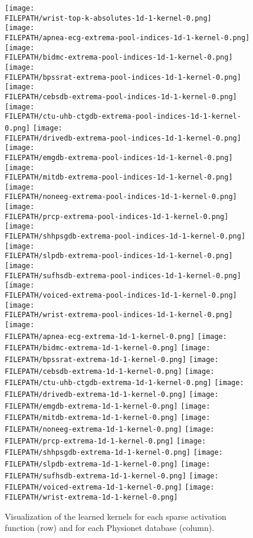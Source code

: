 \documentclass[journal]{IEEEtran}
\providecommand{\FILEPATH}{~/github.com/pbizopoulos/sparsely-activated-networks/packages/python/tmp}
\begin{document}
\begin{figure*}[!t]
  \texttt{[image: \\FILEPATH/wrist-top-k-absolutes-1d-1-kernel-0.png]}
  \\
  \texttt{[image: \\FILEPATH/apnea-ecg-extrema-pool-indices-1d-1-kernel-0.png]}
  \texttt{[image: \\FILEPATH/bidmc-extrema-pool-indices-1d-1-kernel-0.png]}
  \texttt{[image: \\FILEPATH/bpssrat-extrema-pool-indices-1d-1-kernel-0.png]}
  \texttt{[image: \\FILEPATH/cebsdb-extrema-pool-indices-1d-1-kernel-0.png]}
  \texttt{[image: \\FILEPATH/ctu-uhb-ctgdb-extrema-pool-indices-1d-1-kernel-0.png]}
  \texttt{[image: \\FILEPATH/drivedb-extrema-pool-indices-1d-1-kernel-0.png]}
  \texttt{[image: \\FILEPATH/emgdb-extrema-pool-indices-1d-1-kernel-0.png]}
  \texttt{[image: \\FILEPATH/mitdb-extrema-pool-indices-1d-1-kernel-0.png]}
  \texttt{[image: \\FILEPATH/noneeg-extrema-pool-indices-1d-1-kernel-0.png]}
  \texttt{[image: \\FILEPATH/prcp-extrema-pool-indices-1d-1-kernel-0.png]}
  \texttt{[image: \\FILEPATH/shhpsgdb-extrema-pool-indices-1d-1-kernel-0.png]}
  \texttt{[image: \\FILEPATH/slpdb-extrema-pool-indices-1d-1-kernel-0.png]}
  \texttt{[image: \\FILEPATH/sufhsdb-extrema-pool-indices-1d-1-kernel-0.png]}
  \texttt{[image: \\FILEPATH/voiced-extrema-pool-indices-1d-1-kernel-0.png]}
  \texttt{[image: \\FILEPATH/wrist-extrema-pool-indices-1d-1-kernel-0.png]}
  \\
  \texttt{[image: \\FILEPATH/apnea-ecg-extrema-1d-1-kernel-0.png]}
  \texttt{[image: \\FILEPATH/bidmc-extrema-1d-1-kernel-0.png]}
  \texttt{[image: \\FILEPATH/bpssrat-extrema-1d-1-kernel-0.png]}
  \texttt{[image: \\FILEPATH/cebsdb-extrema-1d-1-kernel-0.png]}
  \texttt{[image: \\FILEPATH/ctu-uhb-ctgdb-extrema-1d-1-kernel-0.png]}
  \texttt{[image: \\FILEPATH/drivedb-extrema-1d-1-kernel-0.png]}
  \texttt{[image: \\FILEPATH/emgdb-extrema-1d-1-kernel-0.png]}
  \texttt{[image: \\FILEPATH/mitdb-extrema-1d-1-kernel-0.png]}
  \texttt{[image: \\FILEPATH/noneeg-extrema-1d-1-kernel-0.png]}
  \texttt{[image: \\FILEPATH/prcp-extrema-1d-1-kernel-0.png]}
  \texttt{[image: \\FILEPATH/shhpsgdb-extrema-1d-1-kernel-0.png]}
  \texttt{[image: \\FILEPATH/slpdb-extrema-1d-1-kernel-0.png]}
  \texttt{[image: \\FILEPATH/sufhsdb-extrema-1d-1-kernel-0.png]}
  \texttt{[image: \\FILEPATH/voiced-extrema-1d-1-kernel-0.png]}
  \texttt{[image: \\FILEPATH/wrist-extrema-1d-1-kernel-0.png]}
  \caption{Visualization of the learned kernels for each sparse activation function (row) and for each Physionet database (column).
  }\label{fig:kernelvisualization}
\end{figure*}
\end{document}
